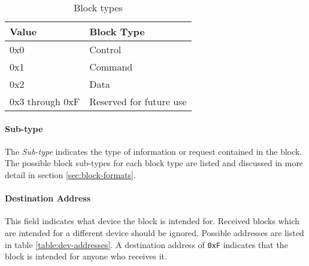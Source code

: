 \begin{table}[H]
    \centering
    \begin{tabular}{@{}ll@{}}
        \toprule
        Value           & Block Type              \\
        \midrule
        0x0             & Control                 \\
        0x1             & Command                 \\
        0x2             & Data                    \\
        0x3 through 0xF & Reserved for future use \\
        \bottomrule
    \end{tabular}
    \caption{Block types}
    \label{table:block-types}
\end{table}

\paragraph{Sub-type}
The \emph{Sub-type} indicates the type of information or request contained in the block. The possible block sub-types
for each block type are listed and discussed in more detail in section \ref{sec:block-formats}.

\paragraph{Destination Address}
This field indicates what device the block is intended for. Received blocks which are intended for a different device
should be ignored. Possible addresses are listed in table \ref{table:dev-addresses}. A destination address of
\lstinline{0xF} indicates that the block is intended for anyone who receives it.
